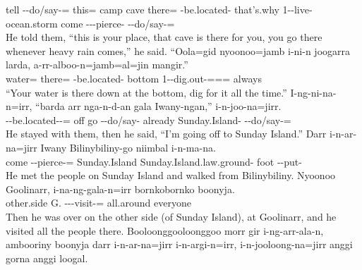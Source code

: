 \begin{exye}
tell --do/say-= this=  camp cave there= -be.located-  that's.why 1--live- ocean.storm come ---pierce- --do/say-=\\
\ft He told them, ``this is your place, that cave is there for you, you go there whenever heavy rain comes,'' he said.
\exy {}
\gll ``Oola=gid nyoonoo=jamb i-ni-n joogarra larda, a-rr-alboo-n=jamb=al=jin mangir.''\\
water= there= -be.located-  bottom 1--dig.out-=== always\\
\ft ``Your water is there down at the bottom, dig for it all the time.''
\exy {}
\gll I-ng-ni-na-n=irr, ``barda arr nga-n-d-an gala Iwany-ngan,'' i-n-joo-na=jirr.\\
--be.located--= off go --do/say- already Sunday.Island- --do/say-=\\
\ft He stayed with them, then he said, ``I'm going off to Sunday Island.''
\newpage\exy {}
\gll Darr i-n-ar-na=jirr Iwany Bilinybiliny-go niimbal i-n-ma-na.\\
come --pierce-= Sunday.Island Sunday.Island.law.ground- foot --put-\\
\ft He met the people on Sunday Island and walked from Bilinybiliny.
\exy {}
\gll Nyoonoo Goolinarr, i-na-ng-gala-n=irr bornkobornko boonyja.\\
other.side G. ---visit-= all.around everyone\\
\ft Then he was over on the other side (of Sunday Island), at Goolinarr, and he visited all the people there.
\exy {}
\gll Booloonggooloonggoo morr gir i-ng-arr-ala-n, ambooriny boonyja darr i-n-ar-na=jirr i-n-argi-n=irr, i-n-jooloong-na=jirr anggi gorna anggi loogal.\\

\end{exye}
